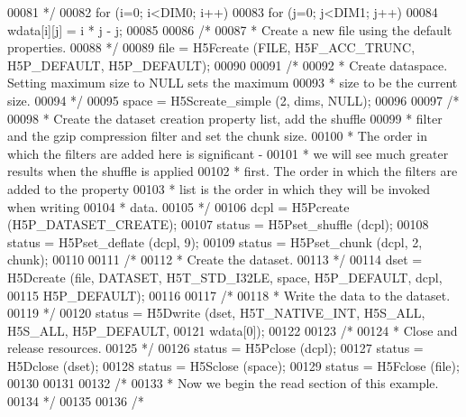 \begin{DoxyCode}
00081 \textcolor{comment}{     */}
00082     \textcolor{keywordflow}{for} (i=0; i<DIM0; i++)
00083         \textcolor{keywordflow}{for} (j=0; j<DIM1; j++)
00084             wdata[i][j] = i * j - j;
00085 
00086     \textcolor{comment}{/*}
00087 \textcolor{comment}{     * Create a new file using the default properties.}
00088 \textcolor{comment}{     */}
00089     file = H5Fcreate (FILE, H5F\_ACC\_TRUNC, H5P\_DEFAULT, H5P\_DEFAULT);
00090 
00091     \textcolor{comment}{/*}
00092 \textcolor{comment}{     * Create dataspace.  Setting maximum size to NULL sets the maximum}
00093 \textcolor{comment}{     * size to be the current size.}
00094 \textcolor{comment}{     */}
00095     space = H5Screate\_simple (2, dims, NULL);
00096 
00097     \textcolor{comment}{/*}
00098 \textcolor{comment}{     * Create the dataset creation property list, add the shuffle}
00099 \textcolor{comment}{     * filter and the gzip compression filter and set the chunk size.}
00100 \textcolor{comment}{     * The order in which the filters are added here is significant -}
00101 \textcolor{comment}{     * we will see much greater results when the shuffle is applied}
00102 \textcolor{comment}{     * first.  The order in which the filters are added to the property}
00103 \textcolor{comment}{     * list is the order in which they will be invoked when writing}
00104 \textcolor{comment}{     * data.}
00105 \textcolor{comment}{     */}
00106     dcpl = H5Pcreate (H5P\_DATASET\_CREATE);
00107     status = H5Pset\_shuffle (dcpl);
00108     status = H5Pset\_deflate (dcpl, 9);
00109     status = H5Pset\_chunk (dcpl, 2, chunk);
00110 
00111     \textcolor{comment}{/*}
00112 \textcolor{comment}{     * Create the dataset.}
00113 \textcolor{comment}{     */}
00114     dset = H5Dcreate (file, DATASET, H5T\_STD\_I32LE, space, H5P\_DEFAULT, dcpl,
00115                 H5P\_DEFAULT);
00116 
00117     \textcolor{comment}{/*}
00118 \textcolor{comment}{     * Write the data to the dataset.}
00119 \textcolor{comment}{     */}
00120     status = H5Dwrite (dset, H5T\_NATIVE\_INT, H5S\_ALL, H5S\_ALL, H5P\_DEFAULT,
00121                 wdata[0]);
00122 
00123     \textcolor{comment}{/*}
00124 \textcolor{comment}{     * Close and release resources.}
00125 \textcolor{comment}{     */}
00126     status = H5Pclose (dcpl);
00127     status = H5Dclose (dset);
00128     status = H5Sclose (space);
00129     status = H5Fclose (file);
00130 
00131 
00132     \textcolor{comment}{/*}
00133 \textcolor{comment}{     * Now we begin the read section of this example.}
00134 \textcolor{comment}{     */}
00135 
00136     \textcolor{comment}{/*}

\end{DoxyCode}
